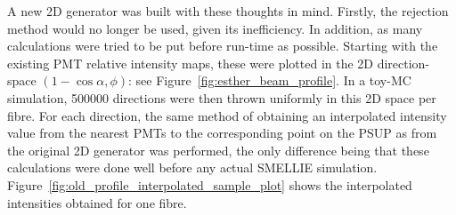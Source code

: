 A new 2D generator was built with these thoughts in mind. Firstly, the rejection method would no longer be used, given its inefficiency. In addition, as many calculations were tried to be put before run-time as possible. Starting with the existing PMT relative intensity maps, these were plotted in the 2D direction-space $(1-\cos\alpha, \phi)$: see Figure~\ref{fig:esther_beam_profile}. In a toy-MC simulation, \num{500000} directions were then thrown uniformly in this 2D space per fibre. For each direction, the same method of obtaining an interpolated intensity value from the nearest PMTs to the corresponding point on the PSUP as from the original 2D generator was performed, the only difference being that these calculations were done well before any actual SMELLIE simulation. Figure~\ref{fig:old_profile_interpolated_sample_plot} shows the interpolated intensities obtained for one fibre.

